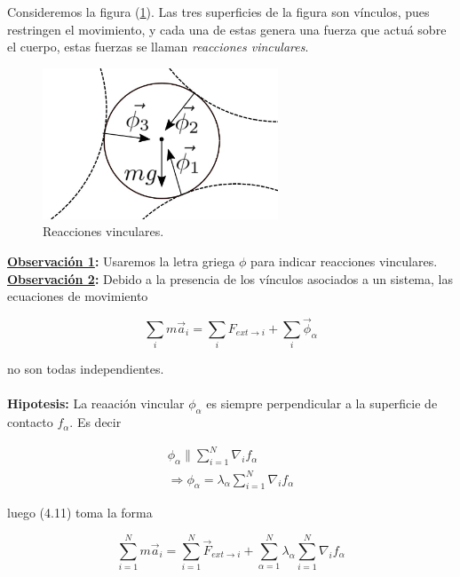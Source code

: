 \documentclass[12pt]{report}
\begin{document}
Consideremos la figura (\ref{fig44}). 
Las tres superficies de la figura son vínculos, pues restringen el movimiento, y cada una de estas genera una fuerza que actuá sobre el cuerpo, estas fuerzas se llaman \textit{reacciones vinculares}. \\

\begin{figure}[h]
	\begin{center}
	\includegraphics[width=7cm]{figura211.png} 
	\caption{ Reacciones vinculares.}
	\label{fig44}
	\end{center}
\end{figure}


\textbf{\underline{Observación 1}:} Usaremos la letra griega $\phi$ para indicar reacciones vinculares. \\ 

\textbf{\underline{Observación 2}:}  Debido a la presencia de los vínculos asociados a un sistema, las ecuaciones de movimiento

\begin{equation}
\sum_{i} m \vec{a}_i = \sum_{i} F_{ext \rightarrow i} + \sum_{i} \vec{\phi}_{\alpha} 
\end{equation}

no son todas independientes. \\ \\


\textbf{Hipotesis:} La reaación vincular $\phi_\alpha$ es siempre  perpendicular a la superficie de contacto $f_\alpha$. Es decir

\begin{eqnarray}
\phi_{\alpha} \parallel \sum_{i=1}^N \nabla_i f_{\alpha} \\
\Rightarrow \phi_{\alpha}=\lambda_{\alpha} \sum_{i=1}^N \nabla_i f_{\alpha}
\end{eqnarray}


luego (4.11) toma la forma

\begin{equation}
\sum_{i=1}^N m \vec{a}_i = \sum_{i=1}^N \vec{F}_{ext \rightarrow i} + \sum_{\alpha=1}^{N} \lambda_{\alpha} \sum_{i=1}^N \nabla_i f_{\alpha}
\end{equation}
\end{document}
